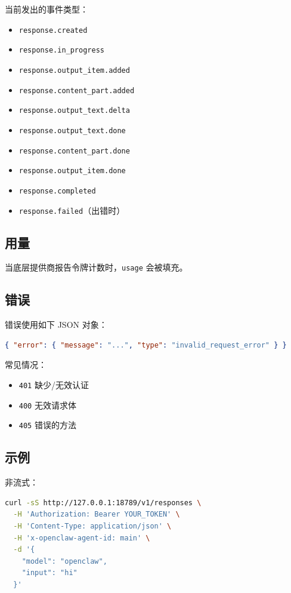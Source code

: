 当前发出的事件类型：

\begin{itemize}
  \item \texttt{response.created}
  \item \texttt{response.in\_progress}
  \item \texttt{response.output\_item.added}
  \item \texttt{response.content\_part.added}
  \item \texttt{response.output\_text.delta}
  \item \texttt{response.output\_text.done}
  \item \texttt{response.content\_part.done}
  \item \texttt{response.output\_item.done}
  \item \texttt{response.completed}
  \item \texttt{response.failed}（出错时）
\end{itemize}


\subsection{用量}


当底层提供商报告令牌计数时，\texttt{usage} 会被填充。

\subsection{错误}


错误使用如下 JSON 对象：

\begin{lstlisting}[language=json]
{ "error": { "message": "...", "type": "invalid_request_error" } }
\end{lstlisting}


常见情况：

\begin{itemize}
  \item \texttt{401} 缺少/无效认证
  \item \texttt{400} 无效请求体
  \item \texttt{405} 错误的方法
\end{itemize}


\subsection{示例}


非流式：

\begin{lstlisting}[language=bash]
curl -sS http://127.0.0.1:18789/v1/responses \
  -H 'Authorization: Bearer YOUR_TOKEN' \
  -H 'Content-Type: application/json' \
  -H 'x-openclaw-agent-id: main' \
  -d '{
    "model": "openclaw",
    "input": "hi"
  }'
\end{lstlisting}


